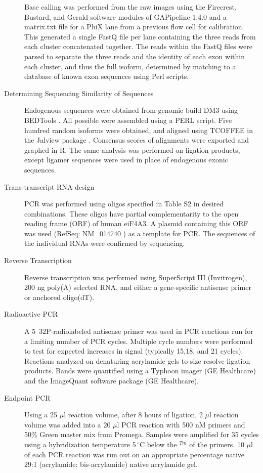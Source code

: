 \begin{description}
		Base calling was performed from the raw images using the Firecrest, Bustard, and Gerald software modules of GAPipeline-1.4.0 and a matrix.txt file for a PhiX lane from a previous flow cell for calibration. This generated a single FastQ file per lane containing the three reads from each cluster concatenated together. The reads within the FastQ files were parsed to separate the three reads and the identity of each exon within each cluster, and thus the full isoform, determined by matching to a database of known exon sequences using Perl scripts.
		
		\item[Determining Sequencing Similarity of \dscam{} Sequences] 
		Endogenous \dscam{} sequences were obtained from genomic build DM3 using BEDTools \citep{Quinlan2010}. All possible \dscam{} were assembled using a PERL script. Five hundred random isoforms were obtained, and aligned using TCOFFEE \citep{Notredame2000} in the Jalview package \citep{Waterhouse2009}. Consensus scores of alignments were exported and graphed in R. The same analysis was performed on \dscam{} ligation products, except ligamer sequences were used in place of endogenous exonic sequences.
		
		\item[Trans-transcript RNA design] 
		PCR was performed using oligos specified in Table S2 in desired combinations. These oligos have partial complementarity to the open reading frame (ORF) of human eiF4A3. A plasmid containing this ORF was used (RefSeq: NM_014740 ) as a template for PCR. The sequences of the individual RNAs were confirmed by sequencing. 

		\item[Reverse Transcription] 
		Reverse transcription was performed using SuperScript III (Invitrogen), 200 ng poly(A) selected RNA, and either a gene-specific antisense primer or anchored oligo(dT).

		\item[Radioactive PCR] 
		A 5\textprime~32P-radiolabeled antisense primer was used in PCR reactions run for a limiting number of PCR cycles. Multiple cycle numbers were performed to test for expected increases in signal (typically 15,18, and 21 cycles). Reactions analyzed on denaturing acrylamide gels to size resolve ligation products. Bands were quantified using a Typhoon imager (GE Healthcare) and the ImageQuant software package (GE Healthcare).

		\item[Endpoint PCR] 
		Using a 25 $\mu$l reaction volume, after 8 hours of ligation, 2 $\mu$l reaction volume was added into a 20 $\mu$l PCR reaction with 500 nM primers and 50\% Green master mix from Promega. Samples were amplified for 35 cycles using a hybridization temperature 5$\,^{\circ}\mathrm{C}$ below the $^{Tm}$ of the primers. 10 $\mu$l of each PCR reaction was run out on an appropriate percentage native 29:1 (acrylamide: bis-acrylamide) native acrylamide gel.


\end{description}
